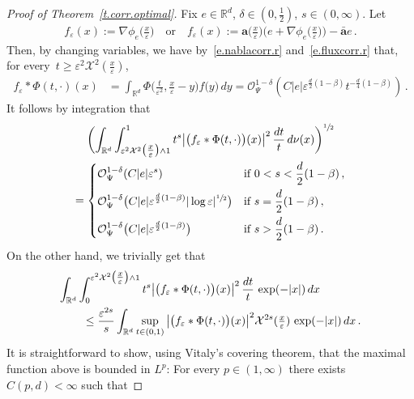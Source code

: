 \documentclass[11pt]{article} %
\numberwithin{equation}{section}
\theoremstyle{definition}
\let\originalleft\left
\let\originalright\right
\renewcommand{\left}{\mathopen{}\mathclose\bgroup\originalleft}
\renewcommand{\right}{\aftergroup\egroup\originalright}
\newcommand*{\R}{\ensuremath{\mathbb{R}}}
\newcommand{\eps}{\varepsilon}
\newcommand{\ep}{\eps}
\renewcommand{\a}{\mathbf{a}}
\newcommand{\ahom}{\bar{\a}}
\newcommand{\X}{\mathcal{X}}
\renewcommand{\O}{\mathcal{O}}
\begin{document}
\begin{proof}[Proof of Theorem~\ref{t.corr.optimal}]
Fix $e \in \R^d$, $\delta \in (0,\frac12)$, $s \in (0,\infty)$. Let  
\begin{align*}  
f_\ep(x) := \nabla \phi_e\bigl( \tfrac{x}{\ep} \bigr)  
\quad \mbox{or} \quad 
f_\ep(x) :=  \a\bigl( \tfrac{x}{\ep} \bigr) \bigl( e + \nabla \phi_e\bigl( \tfrac{x}{\ep} \bigr) \bigr) - \ahom e \,.
\end{align*}
Then, by changing variables, we have by~\eqref{e.nablacorr.r} and~\eqref{e.fluxcorr.r} that, for every~$t \geq \ep^2 \X^2(\tfrac x\ep)$, 
\begin{align*}  
f_\ep\ast \Phi(t,\cdot) (x) 
& 
= 
\int_{\R^d} \Phi\bigl( \tfrac{t}{\ep^2} , \tfrac{x}{\ep} - y \bigr) f\bigl( y \bigr) \, dy 
=
 \O_{\Psi}^{1-\delta} (C |e| \ep^{\frac d2(1-\beta)} t^{-\frac d4(1-\beta)})
 \,.
\end{align*}
It follows by integration that 
\begin{multline}  \label{e.corr.bounds.pre}
\biggl( 
\int_{\R^d} \int_{\ep^2 \X^2\bigl(\tfrac x\ep\bigr) \wedge 1}^1 t^s   \big| \bigl( f_\ep  \ast \Phi(t,\cdot) \bigr) (x) \big|^2 \, \frac{dt}{t} \, d \nu(x)
\biggr)^{\sfrac12} 
\\
= 
\left\{
\begin{aligned}
& \O_{\Psi}^{1-\delta} (C |e| \ep^s) & \mbox{if} & \ 0 < s < \frac{d}{2}(1-\beta)\,,\\
&\O_{\Psi}^{1-\delta}  \bigl( C  |e| \ep^{\frac d2(1-\beta)} | \log \ep|^{\sfrac12} \bigr) & \mbox{if} & \ s = \frac{d}{2}(1-\beta) \,, \\
&\O_{\Psi}^{1-\delta} \bigl( C |e| \ep^{\frac d2(1-\beta)} \bigr) & \mbox{if} & \ s > \frac{d}{2}(1-\beta) \,.
\end{aligned}
\right.
\end{multline}
On the other hand, we trivially get that
\begin{align} \notag  
\lefteqn{
\int_{\R^d} \int_{0}^{\ep^2 \X^2\bigl(\tfrac x\ep\bigr) \wedge 1} t^s   \big| \bigl( f_\ep  \ast \Phi(t,\cdot) \bigr) (x) \big|^2 \, \frac{dt}{t} \, \exp(-|x|) \, dx 
} \qquad &
\\ 
\notag &
\leq 
\frac{\ep^{2s}}s \int_{\R^d} \sup_{t \in (0,1)}  \big| \bigl( f_\ep \ast \Phi(t,\cdot) \bigr) (x) \big|^2 \X^{2s}(\tfrac x\ep) 
\, \exp(-|x|) \, dx 
\,.
\end{align}
It is straightforward to show, using Vitaly's covering theorem, that the maximal function above is bounded in $L^p$: For every $p \in (1,\infty)$ there exists $C(p,d)<\infty$ such that 

\end{proof}
\end{document}
